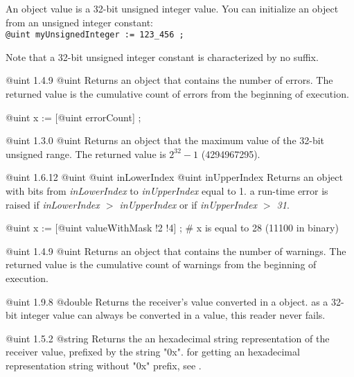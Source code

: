 
An  object value is a 32-bit unsigned integer value. You can initialize an  object from an unsigned integer constant:\\

\texttt{@uint myUnsignedInteger := 123\_456 ;}

Note that a 32-bit unsigned integer constant is characterized by no suffix.


{@uint}
{1.4.9}
{@uint}
{Returns an  object that contains the number of errors.}
{The returned value is the cumulative count of errors from the beginning of execution.}

\exempleUneLigne
{@uint x := [@uint errorCount] ;}

{@uint}
{1.3.0}
{@uint}
{Returns an  object that the maximum value of the 32-bit unsigned range.}
{The returned value is $2^{32}-1$ (4294967295).}


{@uint}
{1.6.12}
{@uint}
{@uint inLowerIndex}
{@uint inUpperIndex}
{Returns an  object with bits from \emph{inLowerIndex} to \emph{inUpperIndex} equal to 1.}
{a run-time error is raised if \emph{inLowerIndex $>$ inUpperIndex} or if \emph{inUpperIndex $>$ 31}.}


\exempleUneLigne
{@uint x := [@uint valueWithMask !2 !4] ; \# x is equal to 28 (11100 in binary)}





{@uint}
{1.4.9}
{@uint}
{Returns an  object that contains the number of warnings.}
{The returned value is the cumulative count of warnings from the beginning of execution.}



{@uint}
{1.9.8}
{@double}
{Returns the receiver's value converted in a  object.}
{as a 32-bit integer value can always be converted in a  value, this reader never fails.}



{@uint}
{1.5.2}
{@string}
{Returns the an hexadecimal string representation of the receiver value, prefixed by the string "0x".}
{for getting an hexadecimal representation string without "0x" prefix, see .}



